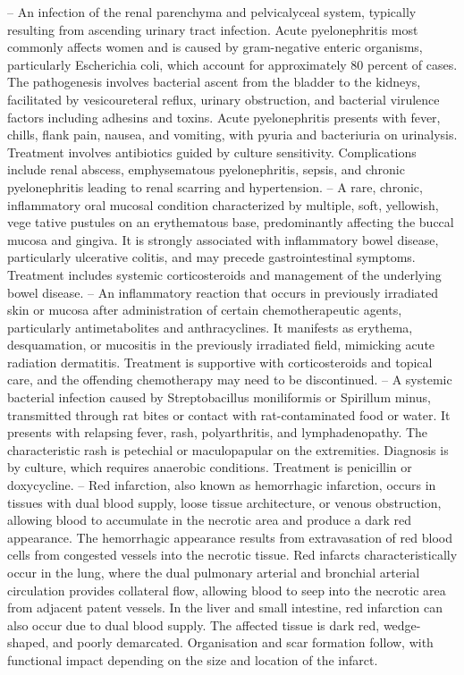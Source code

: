 -- An infection of the renal parenchyma and pelvicalyceal system, typically resulting from ascending urinary tract infection. Acute pyelonephritis most commonly affects women and is caused by gram-negative enteric organisms, particularly Escherichia coli, which account for approximately 80 percent of cases. The pathogenesis involves bacterial ascent from the bladder to the kidneys, facilitated by vesicoureteral reflux, urinary obstruction, and bacterial virulence factors including adhesins and toxins. Acute pyelonephritis presents with fever, chills, flank pain, nausea, and vomiting, with pyuria and bacteriuria on urinalysis. Treatment involves antibiotics guided by culture sensitivity. Complications include renal abscess, emphysematous pyelonephritis, sepsis, and chronic pyelonephritis leading to renal scarring and hypertension.
-- A rare, chronic, inflammatory oral mucosal condition characterized by multiple, soft, yellowish, vege tative pustules on an erythematous base, predominantly affecting the buccal mucosa and gingiva. It is strongly associated with inflammatory bowel disease, particularly ulcerative colitis, and may precede gastrointestinal symptoms. Treatment includes systemic corticosteroids and management of the underlying bowel disease.
-- An inflammatory reaction that occurs in previously irradiated skin or mucosa after administration of certain chemotherapeutic agents, particularly antimetabolites and anthracyclines. It manifests as erythema, desquamation, or mucositis in the previously irradiated field, mimicking acute radiation dermatitis. Treatment is supportive with corticosteroids and topical care, and the offending chemotherapy may need to be discontinued.
-- A systemic bacterial infection caused by Streptobacillus moniliformis or Spirillum minus, transmitted through rat bites or contact with rat-contaminated food or water. It presents with relapsing fever, rash, polyarthritis, and lymphadenopathy. The characteristic rash is petechial or maculopapular on the extremities. Diagnosis is by culture, which requires anaerobic conditions. Treatment is penicillin or doxycycline.
-- Red infarction, also known as hemorrhagic infarction, occurs in tissues with dual blood supply, loose tissue architecture, or venous obstruction, allowing blood to accumulate in the necrotic area and produce a dark red appearance. The hemorrhagic appearance results from extravasation of red blood cells from congested vessels into the necrotic tissue. Red infarcts characteristically occur in the lung, where the dual pulmonary arterial and bronchial arterial circulation provides collateral flow, allowing blood to seep into the necrotic area from adjacent patent vessels. In the liver and small intestine, red infarction can also occur due to dual blood supply. The affected tissue is dark red, wedge-shaped, and poorly demarcated. Organisation and scar formation follow, with functional impact depending on the size and location of the infarct.
